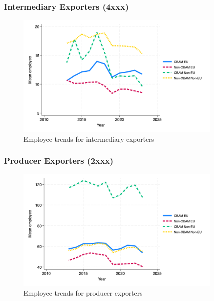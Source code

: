 \documentclass{article}
\begin{document}
\subsubsection{Intermediary Exporters (4xxx)}
\begin{figure}[h!]
\centering
\includegraphics[width=0.9\textwidth]{employee_ei.png}
\caption{Employee trends for intermediary exporters}
\label{fig:employee_ei}
\end{figure}

\subsubsection{Producer Exporters (2xxx)}
\begin{figure}[h!]
\centering
\includegraphics[width=0.9\textwidth]{employee_ep.png}
\caption{Employee trends for producer exporters}
\label{fig:employee_ep}
\end{figure}
\end{document}
